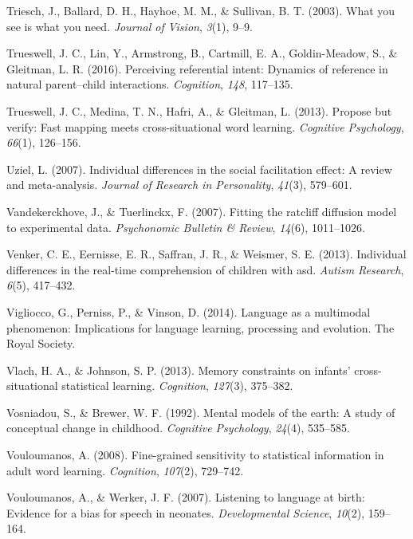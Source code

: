 \documentclass[oneside]{report}
\begin{document}
\hypertarget{ref-triesch2003you}{}
Triesch, J., Ballard, D. H., Hayhoe, M. M., \& Sullivan, B. T. (2003).
What you see is what you need. \emph{Journal of Vision}, \emph{3}(1),
9--9.

\hypertarget{ref-trueswell2016perceiving}{}
Trueswell, J. C., Lin, Y., Armstrong, B., Cartmill, E. A.,
Goldin-Meadow, S., \& Gleitman, L. R. (2016). Perceiving referential
intent: Dynamics of reference in natural parent--child interactions.
\emph{Cognition}, \emph{148}, 117--135.

\hypertarget{ref-trueswell2013propose}{}
Trueswell, J. C., Medina, T. N., Hafri, A., \& Gleitman, L. (2013).
Propose but verify: Fast mapping meets cross-situational word learning.
\emph{Cognitive Psychology}, \emph{66}(1), 126--156.

\hypertarget{ref-uziel2007individual}{}
Uziel, L. (2007). Individual differences in the social facilitation
effect: A review and meta-analysis. \emph{Journal of Research in
Personality}, \emph{41}(3), 579--601.

\hypertarget{ref-vandekerckhove2007fitting}{}
Vandekerckhove, J., \& Tuerlinckx, F. (2007). Fitting the ratcliff
diffusion model to experimental data. \emph{Psychonomic Bulletin \&
Review}, \emph{14}(6), 1011--1026.

\hypertarget{ref-venker2013individual}{}
Venker, C. E., Eernisse, E. R., Saffran, J. R., \& Weismer, S. E.
(2013). Individual differences in the real-time comprehension of
children with asd. \emph{Autism Research}, \emph{6}(5), 417--432.

\hypertarget{ref-vigliocco2014language}{}
Vigliocco, G., Perniss, P., \& Vinson, D. (2014). Language as a
multimodal phenomenon: Implications for language learning, processing
and evolution. The Royal Society.

\hypertarget{ref-vlach2013memory}{}
Vlach, H. A., \& Johnson, S. P. (2013). Memory constraints on infants'
cross-situational statistical learning. \emph{Cognition}, \emph{127}(3),
375--382.

\hypertarget{ref-vosniadou1992mental}{}
Vosniadou, S., \& Brewer, W. F. (1992). Mental models of the earth: A
study of conceptual change in childhood. \emph{Cognitive Psychology},
\emph{24}(4), 535--585.

\hypertarget{ref-vouloumanos2008fine}{}
Vouloumanos, A. (2008). Fine-grained sensitivity to statistical
information in adult word learning. \emph{Cognition}, \emph{107}(2),
729--742.

\hypertarget{ref-vouloumanos2007listening}{}
Vouloumanos, A., \& Werker, J. F. (2007). Listening to language at
birth: Evidence for a bias for speech in neonates. \emph{Developmental
Science}, \emph{10}(2), 159--164.
\end{document}
